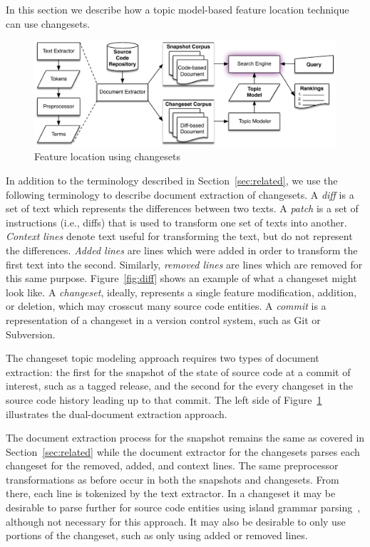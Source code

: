 In this section we describe how a topic model-based feature location
technique can use changesets.



\begin{figure}
\centerline{\includegraphics[width=.75\textwidth]{figures/changeset-flt}}
\caption{Feature location using changesets}
\label{fig:changeset}
\end{figure}

In addition to the terminology described in Section~\ref{sec:related},
we use the following terminology to describe document extraction of changesets.
A \textit{diff} is a set of text which represents the differences between two texts.
A \textit{patch} is a set of instructions (i.e., diffs) that is used to transform one set of texts into another.
\textit{Context lines} denote text useful for transforming the text, but do not represent the differences.
\textit{Added lines} are lines which were added in order to transform the first text into the second.
Similarly, \textit{removed lines} are lines which are removed for this same purpose.
Figure~\ref{fig:diff} shows an example of what a changeset might look like.
A \textit{changeset}, ideally, represents a single feature modification,
addition, or deletion, which may crosscut many source code entities.
A \textit{commit} is a representation of a changeset in a version control system, such as Git or Subversion.

The changeset topic modeling approach requires two types of document extraction:
the first for the snapshot of the state of source code at a commit of interest, such as a tagged release,
and the second for the every changeset in the source code history leading up to that commit.
The left side of Figure~\ref{fig:changeset} illustrates the dual-document extraction approach.

The document extraction process for the snapshot remains the same as covered in Section~\ref{sec:related} while the
document extractor for the changesets parses each changeset for the removed, added, and context lines.
The same preprocessor transformations as before occur in both the snapshots and changesets.
From there, each line is tokenized by the text extractor.
In a changeset it may be desirable to parse further for source code entities using island grammar parsing~\cite{Moonen:2001},
although not necessary for this approach.
It may also be desirable to only use portions of the changeset, such as only using added or removed lines.

